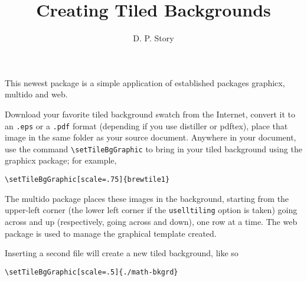 \documentclass{article}
\title{Creating Tiled Backgrounds}
\author{D. P. Story}
\begin{document}
\maketitle


This newest package is a simple application of established packages
\textsf{graphicx}, \textsf{multido} and \textsf{web}.

Download your favorite tiled background swatch from the Internet,
convert it to an \texttt{.eps} or a \texttt{.pdf} format (depending
if you use \textsf{distiller} or \textsf{pdftex}), place that image
in the same folder as your source document. Anywhere in your
document, use the command \verb!\setTileBgGraphic! to bring in your
tiled background using the \textsf{graphicx} package; for example,
\begin{verbatim}
\setTileBgGraphic[scale=.75]{brewtile1}
\end{verbatim}
The \textsf{multido} package places these images in the background,
starting from the upper-left corner (the lower left corner if the
\texttt{uselltiling} option is taken) going across and up
(respectively, going across and down), one row at a time. The web
package is used to manage the graphical template created.

\newpage


Inserting a second file will create a new tiled background, like so
\begin{verbatim}
\setTileBgGraphic[scale=.5]{./math-bkgrd}
\end{verbatim}
\end{document}
